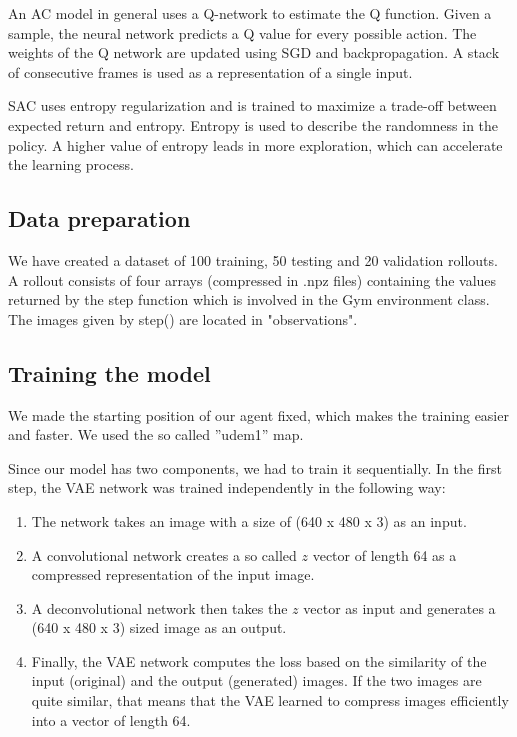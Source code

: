 \documentclass{article}
\begin{document}
An AC model in general uses a Q-network to estimate the Q function. Given a sample, the neural network predicts a Q value for every possible action. The weights of the Q network are updated using SGD and backpropagation. A stack of consecutive frames is used as a representation of a single input.

SAC uses entropy regularization and is trained to maximize a trade-off between expected return and entropy. Entropy is used to describe the randomness in the policy. A higher value of entropy leads in more exploration, which can accelerate the learning process.

\subsection{Data preparation}
We have created a dataset of 100 training, 50 testing and 20 validation rollouts. A rollout consists of four arrays (compressed in .npz files) containing the values returned by the step function which is involved in the Gym environment class. The images given by step() are located in "observations".

\subsection{Training the model}
We made the starting position of our agent fixed, which makes the training easier and faster. We used the so called ''udem1'' map.

Since our model has two components, we had to train it sequentially. In the first step, the VAE network was trained independently in the following way:
\begin{enumerate}
    \item The network takes an image with a size of (640 x 480 x 3) as an input.
    \item A convolutional network creates a so called $z$ vector of length 64 as a compressed representation of the input image.
    \item A deconvolutional network then takes the $z$ vector as input and generates a (640 x 480 x 3) sized image as an output.
    \item Finally, the VAE network computes the loss based on the similarity of the input (original) and the output (generated) images. If the two images are quite similar, that means that the VAE learned to compress images efficiently into a vector of length 64.
\end{enumerate}
\end{document}
